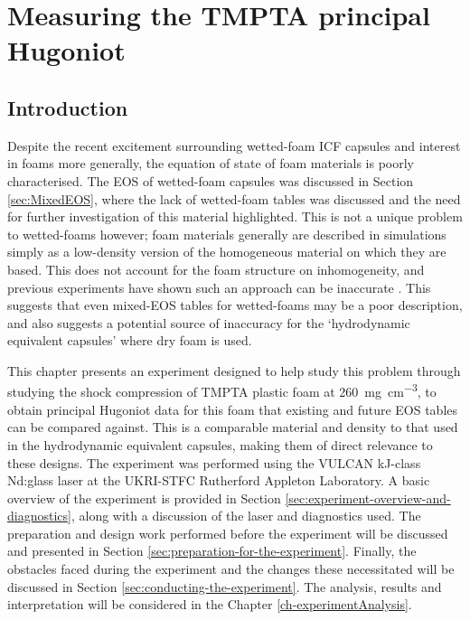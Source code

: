 

\chapter{\label{ch-experiment}Measuring the TMPTA principal Hugoniot}

\minitoc

\section{Introduction}

Despite the recent excitement surrounding wetted-foam ICF capsules and interest in foams more generally, the equation of state of foam materials is poorly characterised. The EOS of wetted-foam capsules was discussed in Section \ref{sec:MixedEOS}, where the lack of wetted-foam tables was discussed and the need for further investigation of this material highlighted. This is not a unique problem to wetted-foams however; foam materials generally are described in simulations simply as a low-density version of the homogeneous material on which they are based. This does not account for the foam structure on inhomogeneity, and previous experiments have shown such an approach can be inaccurate \cite{Nicolai2012}. This suggests that even mixed-EOS tables for wetted-foams may be a poor description, and also suggests a potential source of inaccuracy for the `hydrodynamic equivalent capsules' where dry foam is used.

This chapter presents an experiment designed to help study this problem through studying the shock compression of TMPTA plastic foam at 260~\unit{\milli\gram\per\centi\meter\cubed}, to obtain principal Hugoniot data for this foam that existing and future EOS tables can be compared against. This is a comparable material and density to that used in the hydrodynamic equivalent capsules, making them of direct relevance to these designs. The experiment was performed using the VULCAN kJ-class Nd:glass laser at the UKRI-STFC Rutherford Appleton Laboratory. A basic overview of the experiment is provided in Section \ref{sec:experiment-overview-and-diagnostics}, along with a discussion of the laser and diagnostics used. The preparation and design work performed before the experiment will be discussed and presented in Section \ref{sec:preparation-for-the-experiment}. Finally, the obstacles faced during the experiment and the changes these necessitated will be discussed in Section \ref{sec:conducting-the-experiment}. The analysis, results and interpretation will be considered in the Chapter \ref{ch-experimentAnalysis}.

